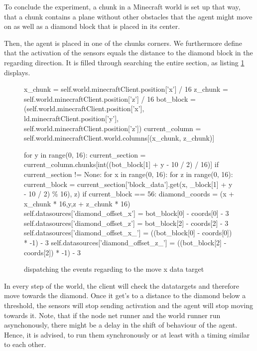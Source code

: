 To conclude the experiment, a chunk in a Minecraft world is set up that way, that a chunk contains a plane without other obstacles that the agent might move on as well as a diamond block that is placed in its center. 

Then, the agent is placed in one of the chunks corners. We furthermore define that the activation of the sensors equals the distance to the diamond block in the regarding direction. It is filled through searching the entire section, as listing \ref{listing_sensors} displays.

		\begin{figure}[ht]
			\centering
			\begin{minipage}{15cm}
				\begin{pseudocode}
x_chunk = self.world.minecraftClient.position['x'] / 16
z_chunk = self.world.minecraftClient.position['z'] / 16
bot_block = (self.world.minecraftClient.position['x'], ld.minecraftClient.position['y'], self.world.minecraftClient.position['z'])
current_column = self.world.minecraftClient.world.columns[(x_chunk, z_chunk)]

for y in range(0, 16):
    current_section = current_column.chunks[int((bot_block[1] + y - 10 / 2) / 16)]
    if current_section != None:
        for x in range(0, 16):
            for z in range(0, 16):
                current_block = current_section['block_data'].get(x, _block[1] + y - 10 / 2) \% 16), z)
                if current_block == 56:
                    diamond_coords = (x + x_chunk * 16,y,z + z_chunk * 16)
                    self.datasources['diamond_offset_x'] = bot_block[0] - coords[0] - 3
                    self.datasources['diamond_offset_z'] = bot_block[2] - coords[2] - 3
                    self.datasources['diamond_offset_x_'] = ((bot_block[0] - coords[0]) * -1) - 3
                    self.datasources['diamond_offset_z_'] = ((bot_block[2] - coords[2]) * -1) - 3
			\end{pseudocode}
		\caption{dispatching the events regarding to the move x data target}
		\label{listing_sensors}
	\end{minipage}
\end{figure}
    
In every step of the world, the client will check the datatargets and therefore move towards the diamond. Once it get's to a distance to the diamond below a threshold, the sensors will stop sending activation and the agent will stop moving towards it. Note, that if the node net runner and the world runner run asynchonously, there might be a delay in the shift of behaviour of the agent. Hence, it is advised, to run them synchronously or at least with a timing similar to each other.

